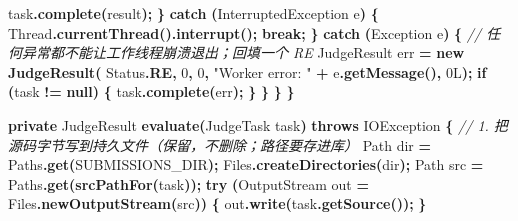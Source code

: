 \documentclass[
  11pt,
]{ctexart}
\newenvironment{Shaded}{\begin{snugshade}}{\end{snugshade}}
\newcommand{\BuiltInTok}[1]{#1}
\newcommand{\CommentTok}[1]{\textcolor[rgb]{0.56,0.35,0.01}{\textit{#1}}}
\newcommand{\ControlFlowTok}[1]{\textcolor[rgb]{0.13,0.29,0.53}{\textbf{#1}}}
\newcommand{\DecValTok}[1]{\textcolor[rgb]{0.00,0.00,0.81}{#1}}
\newcommand{\FunctionTok}[1]{\textcolor[rgb]{0.13,0.29,0.53}{\textbf{#1}}}
\newcommand{\KeywordTok}[1]{\textcolor[rgb]{0.13,0.29,0.53}{\textbf{#1}}}
\newcommand{\NormalTok}[1]{#1}
\newcommand{\OperatorTok}[1]{\textcolor[rgb]{0.81,0.36,0.00}{\textbf{#1}}}
\newcommand{\StringTok}[1]{\textcolor[rgb]{0.31,0.60,0.02}{#1}}
\begin{document}
\begin{Shaded}
\begin{Highlighting}[]
\NormalTok{                task}\OperatorTok{.}\FunctionTok{complete}\OperatorTok{(}\NormalTok{result}\OperatorTok{);}
            \OperatorTok{\}} \ControlFlowTok{catch} \OperatorTok{(}\BuiltInTok{InterruptedException}\NormalTok{ e}\OperatorTok{)} \OperatorTok{\{}
                \BuiltInTok{Thread}\OperatorTok{.}\FunctionTok{currentThread}\OperatorTok{().}\FunctionTok{interrupt}\OperatorTok{();}
                \ControlFlowTok{break}\OperatorTok{;}
            \OperatorTok{\}} \ControlFlowTok{catch} \OperatorTok{(}\BuiltInTok{Exception}\NormalTok{ e}\OperatorTok{)} \OperatorTok{\{}
                \CommentTok{// 任何异常都不能让工作线程崩溃退出；回填一个 RE}
\NormalTok{                JudgeResult err }\OperatorTok{=} \KeywordTok{new} \FunctionTok{JudgeResult}\OperatorTok{(}
\NormalTok{                    Status}\OperatorTok{.}\FunctionTok{RE}\OperatorTok{,} \DecValTok{0}\OperatorTok{,} \DecValTok{0}\OperatorTok{,} \StringTok{"Worker error: "} \OperatorTok{+}\NormalTok{ e}\OperatorTok{.}\FunctionTok{getMessage}\OperatorTok{(),} \DecValTok{0L}\OperatorTok{);}
                \ControlFlowTok{if} \OperatorTok{(}\NormalTok{task }\OperatorTok{!=} \KeywordTok{null}\OperatorTok{)} \OperatorTok{\{}
\NormalTok{                    task}\OperatorTok{.}\FunctionTok{complete}\OperatorTok{(}\NormalTok{err}\OperatorTok{);}
                \OperatorTok{\}}
            \OperatorTok{\}}
        \OperatorTok{\}}
    \OperatorTok{\}}

    \KeywordTok{private}\NormalTok{ JudgeResult }\FunctionTok{evaluate}\OperatorTok{(}\NormalTok{JudgeTask task}\OperatorTok{)} \KeywordTok{throws} \BuiltInTok{IOException} \OperatorTok{\{}
        \CommentTok{// 1. 把源码字节写到持久文件（保留，不删除；路径要存进库）}
\NormalTok{        Path dir }\OperatorTok{=}\NormalTok{ Paths}\OperatorTok{.}\FunctionTok{get}\OperatorTok{(}\NormalTok{SUBMISSIONS\_DIR}\OperatorTok{);}
\NormalTok{        Files}\OperatorTok{.}\FunctionTok{createDirectories}\OperatorTok{(}\NormalTok{dir}\OperatorTok{);}
\NormalTok{        Path src }\OperatorTok{=}\NormalTok{ Paths}\OperatorTok{.}\FunctionTok{get}\OperatorTok{(}\FunctionTok{srcPathFor}\OperatorTok{(}\NormalTok{task}\OperatorTok{));}
        \ControlFlowTok{try} \OperatorTok{(}\BuiltInTok{OutputStream}\NormalTok{ out }\OperatorTok{=}\NormalTok{ Files}\OperatorTok{.}\FunctionTok{newOutputStream}\OperatorTok{(}\NormalTok{src}\OperatorTok{))} \OperatorTok{\{}
\NormalTok{            out}\OperatorTok{.}\FunctionTok{write}\OperatorTok{(}\NormalTok{task}\OperatorTok{.}\FunctionTok{getSource}\OperatorTok{());}
        \OperatorTok{\}}


\end{Highlighting}
\end{Shaded}
\end{document}
